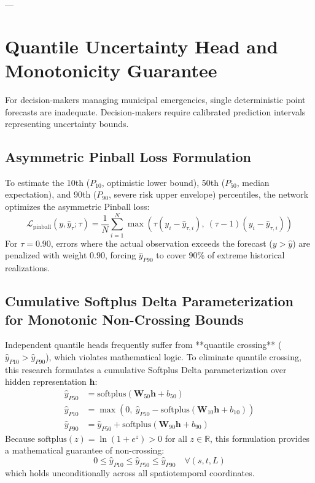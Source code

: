 ---

\section{Quantile Uncertainty Head and Monotonicity Guarantee}
\label{sec:quantile_head}

For decision-makers managing municipal emergencies, single deterministic point forecasts are inadequate. Decision-makers require calibrated prediction intervals representing uncertainty bounds.

\subsection{Asymmetric Pinball Loss Formulation}
\label{subsec:pinball_loss}

To estimate the 10th ($P_{10}$, optimistic lower bound), 50th ($P_{50}$, median expectation), and 90th ($P_{90}$, severe risk upper envelope) percentiles, the network optimizes the asymmetric Pinball loss:
\begin{equation}
\label{eq:pinball_loss}
\mathcal{L}_{\text{pinball}}(y, \hat{y}_\tau; \tau) = \frac{1}{N} \sum_{i=1}^N \max\left(\tau (y_i - \hat{y}_{\tau, i}), \ (\tau - 1)(y_i - \hat{y}_{\tau, i})\right)
\end{equation}
For $\tau = 0.90$, errors where the actual observation exceeds the forecast ($y > \hat{y}$) are penalized with weight $0.90$, forcing $\hat{y}_{P90}$ to cover $90\%$ of extreme historical realizations.

\subsection{Cumulative Softplus Delta Parameterization for Monotonic Non-Crossing Bounds}
\label{subsec:monotonicity_guarantee}

Independent quantile heads frequently suffer from **quantile crossing** ($\hat{y}_{P10} > \hat{y}_{P90}$), which violates mathematical logic. To eliminate quantile crossing, this research formulates a cumulative Softplus Delta parameterization over hidden representation $\mathbf{h}$:
\begin{align}
\label{eq:quantile_p50}
\hat{y}_{P50} &= \text{softplus}\left(\mathbf{W}_{50} \mathbf{h} + b_{50}\right) \\
\label{eq:quantile_p10}
\hat{y}_{P10} &= \max\left(0, \ \hat{y}_{P50} - \text{softplus}\left(\mathbf{W}_{10} \mathbf{h} + b_{10}\right)\right) \\
\label{eq:quantile_p90}
\hat{y}_{P90} &= \hat{y}_{P50} + \text{softplus}\left(\mathbf{W}_{90} \mathbf{h} + b_{90}\right)
\end{align}
Because $\text{softplus}(z) = \ln(1 + e^z) > 0$ for all $z \in \mathbb{R}$, this formulation provides a mathematical guarantee of non-crossing:
\begin{equation}
\label{eq:monotonicity_proof}
0 \le \hat{y}_{P10} \le \hat{y}_{P50} \le \hat{y}_{P90} \quad \forall (s, t, L)
\end{equation}
which holds unconditionally across all spatiotemporal coordinates.

